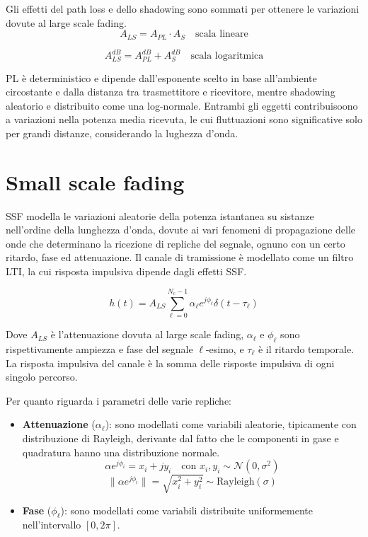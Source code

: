 Gli effetti del path loss e dello shadowing sono sommati per ottenere le variazioni dovute al large scale fading. 
\[
    A_{LS} = A_{PL} \cdot A_S \quad \text{scala lineare}
\]

\[
    A_{LS}^{dB} = A_{PL}^{dB} + A_S^{dB} \quad \text{scala logaritmica}
\]


PL è deterministico e dipende dall'esponente scelto in base all'ambiente circostante e dalla distanza tra trasmettitore e ricevitore, mentre shadowing aleatorio e distribuito come una log-normale. Entrambi gli eggetti contribuisoono a variazioni nella potenza media ricevuta, le cui fluttuazioni sono significative solo per grandi distanze, considerando la lughezza d'onda.



\section*{Small scale fading}

SSF modella le variazioni aleatorie della potenza istantanea su sistanze nell'ordine della lunghezza d'onda, dovute ai vari fenomeni di propagazione delle onde che determinano la ricezione di repliche del segnale, ognuno con un certo ritardo, fase ed attenuazione. Il canale di tramissione è modellato come un filtro LTI, la cui risposta impulsiva dipende dagli effetti SSF.

\[
    h(t) = A_{LS} \sum_{\ell=0}^{N_c-1} \alpha_{\ell} e^{j\phi_{\ell}} \delta(t - \tau_{\ell})
\]

Dove \( A_{LS} \) è l'attenuazione dovuta al large scale fading, \( \alpha_{\ell} \) e \( \phi_{\ell} \) sono rispettivamente ampiezza e fase del segnale \(\ell\)-esimo, e \( \tau_{\ell} \) è il ritardo temporale. La risposta impulsiva del canale è la somma delle risposte impulsiva di ogni singolo percorso.

Per quanto riguarda i parametri delle varie repliche:
\begin{itemize}
    \item \textbf{Attenuazione} ($\alpha_\ell$): sono modellati come variabili aleatorie, tipicamente con distribuzione di Rayleigh, derivante dal fatto che le componenti in gase e quadratura hanno una distribuzione normale.
    \[
        \alpha e^{j\phi_i} = x_i + j y_i \quad \text{con } x_i, y_i \sim \mathcal{N}(0, \sigma^2)
    \]
    \[
        \|\alpha e^{j\phi_i}\| = \sqrt{x_i^2 + y_i^2} \sim \text{Rayleigh}(\sigma)
    \]
    \item \textbf{Fase} ($\phi_\ell$): sono modellati come variabili distribuite uniformemente nell'intervallo $[0, 2\pi]$.
\end{itemize}

